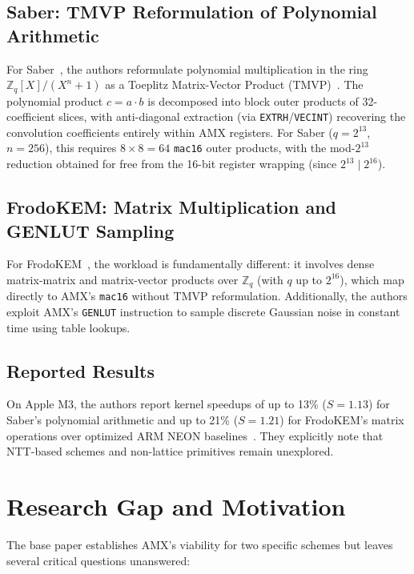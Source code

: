 \documentclass[utf8]{FrontiersinHarvard}
\begin{document}
\subsection{Saber: TMVP Reformulation of Polynomial Arithmetic}

For Saber~\cite{dangelo2018saber}, the authors reformulate polynomial multiplication in the ring $\mathbb{Z}_q[X]/(X^n+1)$ as a Toeplitz Matrix-Vector Product (TMVP)~\cite{toeplitz1911theorie}. The polynomial product $c = a \cdot b$ is decomposed into block outer products of 32-coefficient slices, with anti-diagonal extraction (via \texttt{EXTRH}/\texttt{VECINT}) recovering the convolution coefficients entirely within AMX registers. For Saber ($q = 2^{13}$, $n = 256$), this requires $8 \times 8 = 64$ \texttt{mac16} outer products, with the mod-$2^{13}$ reduction obtained for free from the 16-bit register wrapping (since $2^{13} \mid 2^{16}$).

\subsection{FrodoKEM: Matrix Multiplication and GENLUT Sampling}

For FrodoKEM~\cite{bos2020frodokem}, the workload is fundamentally different: it involves dense matrix-matrix and matrix-vector products over $\mathbb{Z}_q$ (with $q$ up to $2^{16}$), which map directly to AMX's \texttt{mac16} without TMVP reformulation. Additionally, the authors exploit AMX's \texttt{GENLUT} instruction to sample discrete Gaussian noise in constant time using table lookups.

\subsection{Reported Results}

On Apple M3, the authors report kernel speedups of up to 13\% ($S = 1.13$) for Saber's polynomial arithmetic and up to 21\% ($S = 1.21$) for FrodoKEM's matrix operations over optimized ARM NEON baselines~\cite{gazzoni2024pqcamx}. They explicitly note that NTT-based schemes and non-lattice primitives remain unexplored.


\section{Research Gap and Motivation}
\label{sec:gap}

The base paper establishes AMX's viability for two specific schemes but leaves several critical questions unanswered:
\end{document}
